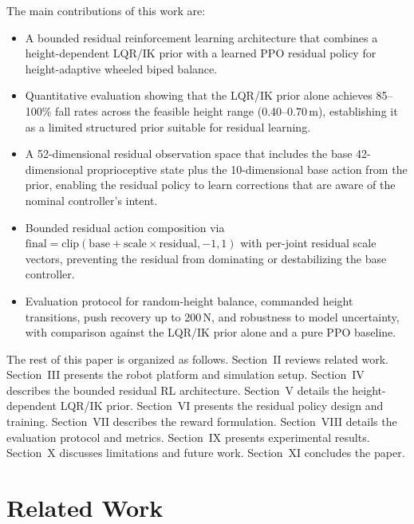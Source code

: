\documentclass[conference]{IEEEtran}
\begin{document}
The main contributions of this work are:
\begin{itemize}
    \item A bounded residual reinforcement learning architecture that combines
    a height-dependent LQR/IK prior with a learned PPO residual policy for
    height-adaptive wheeled biped balance.
    \item Quantitative evaluation showing that the LQR/IK prior alone achieves
    85--100\% fall rates across the feasible height range (0.40--0.70\,m),
    establishing it as a limited structured prior suitable
    for residual learning.
    \item A 52-dimensional residual observation space that includes the base
    42-dimensional proprioceptive state plus the 10-dimensional base action
    from the prior, enabling the residual policy to learn corrections that
    are aware of the nominal controller's intent.
    \item Bounded residual action composition via
    $\text{final} = \text{clip}(\text{base} + \text{scale} \times \text{residual}, -1, 1)$
    with per-joint residual scale vectors, preventing the residual from
    dominating or destabilizing the base controller.
    \item Evaluation protocol for random-height balance, commanded
    height transitions, push recovery up to 200\,N, and robustness to model
    uncertainty, with comparison against the LQR/IK prior alone and a pure PPO baseline.
\end{itemize}

The rest of this paper is organized as follows.
Section~II reviews related work.
Section~III presents the robot platform and simulation setup.
Section~IV describes the bounded residual RL architecture.
Section~V details the height-dependent LQR/IK prior.
Section~VI presents the residual policy design and training.
Section~VII describes the reward formulation.
Section~VIII details the evaluation protocol and metrics.
Section~IX presents experimental results.
Section~X discusses limitations and future work.
Section~XI concludes the paper.

\section{Related Work}
\label{sec:related}
\end{document}
